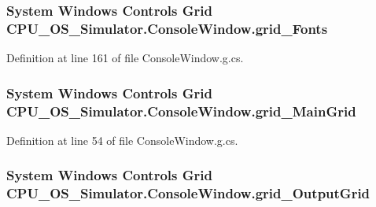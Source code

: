 \subsubsection[{grid\+\_\+\+Fonts}]{\setlength{\rightskip}{0pt plus 5cm}System Windows Controls Grid C\+P\+U\+\_\+\+O\+S\+\_\+\+Simulator.\+Console\+Window.\+grid\+\_\+\+Fonts\hspace{0.3cm}{\ttfamily [package]}}\label{class_c_p_u___o_s___simulator_1_1_console_window_a5dd489a5756d308a9adc8498dea24ddb}


Definition at line 161 of file Console\+Window.\+g.\+cs.

\hypertarget{class_c_p_u___o_s___simulator_1_1_console_window_a28c9b155f3287ca00079175dc675eee4}{}
\subsubsection[{grid\+\_\+\+Main\+Grid}]{\setlength{\rightskip}{0pt plus 5cm}System Windows Controls Grid C\+P\+U\+\_\+\+O\+S\+\_\+\+Simulator.\+Console\+Window.\+grid\+\_\+\+Main\+Grid\hspace{0.3cm}{\ttfamily [package]}}\label{class_c_p_u___o_s___simulator_1_1_console_window_a28c9b155f3287ca00079175dc675eee4}


Definition at line 54 of file Console\+Window.\+g.\+cs.

\hypertarget{class_c_p_u___o_s___simulator_1_1_console_window_afef6d481c8b608672b98da16721143b0}{}
\subsubsection[{grid\+\_\+\+Output\+Grid}]{\setlength{\rightskip}{0pt plus 5cm}System Windows Controls Grid C\+P\+U\+\_\+\+O\+S\+\_\+\+Simulator.\+Console\+Window.\+grid\+\_\+\+Output\+Grid\hspace{0.3cm}{\ttfamily [package]}}\label{class_c_p_u___o_s___simulator_1_1_console_window_afef6d481c8b608672b98da16721143b0}


